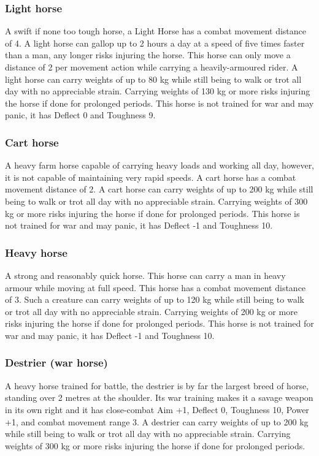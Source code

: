 \documentclass[a4paper,11pt,oneside]{book}
\begin{document}
\subsubsection*{Light horse}
A swift if none too tough horse, a Light Horse has a combat movement distance of 4. A light horse can gallop up to 2 hours a day at a speed of five times faster than a man, any longer risks injuring the horse. This horse can only move a distance of 2 per movement action while carrying a heavily-armoured rider. A light horse can carry weights of up to 80 kg while still being to walk or trot all day with no appreciable strain. Carrying weights of 130 kg or more risks injuring the horse if done for prolonged periods. This horse is not trained for war and may panic, it has Deflect 0 and Toughness 9.

\subsubsection*{Cart horse}
A heavy farm horse capable of carrying heavy loads and working all day, however, it is not capable of maintaining very rapid speeds. A cart horse has a combat movement distance of 2. A cart horse can carry weights of up to 200 kg while still being to walk or trot all day with no appreciable strain. Carrying weights of 300 kg or more risks injuring the horse if done for prolonged periods. This horse is not trained for war and may panic, it has Deflect -1 and Toughness 10.

\subsubsection*{Heavy horse}
A strong and reasonably quick horse. This horse can carry a man in heavy armour while moving at full speed. This horse has a combat movement distance of 3. Such a creature can carry weights of up to 120 kg while still being to walk or trot all day with no appreciable strain. Carrying weights of 200 kg or more risks injuring the horse if done for prolonged periods. This horse is not trained for war and may panic, it has Deflect -1 and Toughness 10.

\subsubsection*{Destrier (war horse)}
A heavy horse trained for battle, the destrier is by far the largest breed of horse, standing over 2 metres at the shoulder. Its war training makes it a savage weapon in its own right and it has close-combat Aim +1, Deflect 0, Toughness 10, Power +1, and combat movement range 3. A destrier can carry weights of up to 200 kg while still being to walk or trot all day with no appreciable strain. Carrying weights of 300 kg or more risks injuring the horse if done for prolonged periods.
\end{document}
